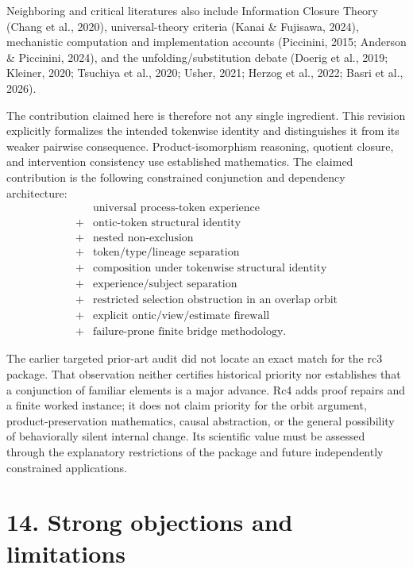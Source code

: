 \documentclass[
  11pt,
  a4paper,
]{article}
\begin{document}
Neighboring and critical literatures also include Information Closure
Theory (Chang et al., 2020), universal-theory criteria (Kanai \&
Fujisawa, 2024), mechanistic computation and implementation accounts
(Piccinini, 2015; Anderson \& Piccinini, 2024), and the
unfolding/substitution debate (Doerig et al., 2019; Kleiner, 2020;
Tsuchiya et al., 2020; Usher, 2021; Herzog et al., 2022; Basri et al.,
2026).

The contribution claimed here is therefore not any single ingredient.
This revision explicitly formalizes the intended tokenwise identity and
distinguishes it from its weaker pairwise consequence.
Product-isomorphism reasoning, quotient closure, and intervention
consistency use established mathematics. The claimed contribution is the
following constrained conjunction and dependency architecture:
\nopagebreak[4]
\[
\boxed{
\begin{aligned}
&\text{universal process-token experience}\\
+&\text{ontic-token structural identity}\\
+&\text{nested non-exclusion}\\
+&\text{token/type/lineage separation}\\
+&\text{composition under tokenwise structural identity}\\
+&\text{experience/subject separation}\\
+&\text{restricted selection obstruction in an overlap orbit}\\
+&\text{explicit ontic/view/estimate firewall}\\
+&\text{failure-prone finite bridge methodology}.
\end{aligned}
}
\]

The earlier targeted prior-art audit did not locate an exact match for
the rc3 package. That observation neither certifies historical priority
nor establishes that a conjunction of familiar elements is a major
advance. Rc4 adds proof repairs and a finite worked instance; it does
not claim priority for the orbit argument, product-preservation
mathematics, causal abstraction, or the general possibility of
behaviorally silent internal change. Its scientific value must be
assessed through the explanatory restrictions of the package and future
independently constrained applications.

\hypertarget{strong-objections-and-limitations}{%
\section{14. Strong objections and
limitations}\label{strong-objections-and-limitations}}
\end{document}
